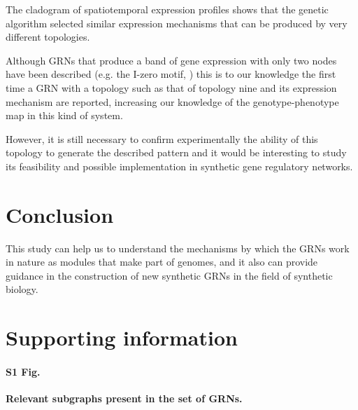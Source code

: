 \documentclass[10pt,letterpaper]{article}
\begin{document}
The cladogram of spatiotemporal expression profiles shows that the genetic 
algorithm selected similar expression mechanisms that can be produced by very 
different topologies.

Although GRNs that produce a band of gene expression with only two nodes have 
been described (e.g. the I-zero motif, \cite{Schaerli2014}) this is to our 
knowledge the first time a GRN with a topology such as that of topology nine 
and its expression mechanism are reported, increasing our knowledge of the 
genotype-phenotype map in this kind of system. 

However, it is still necessary to confirm experimentally the ability of this 
topology to generate the described pattern and it would be interesting to 
study its feasibility and possible implementation in synthetic gene regulatory 
networks.

\section*{Conclusion}

This study can help us to understand the mechanisms by which the GRNs work in
nature as modules that make part of genomes, and it also can provide guidance
in the construction of new synthetic GRNs in the field of synthetic biology.



\section*{Supporting information}

\paragraph*{S1 Fig.}
\label{S1_Fig}
{\bf Relevant subgraphs present in the set of GRNs.}
\end{document}
